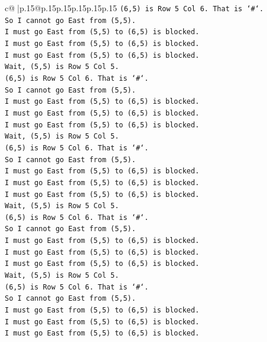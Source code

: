 \documentclass{article}
\begin{document}
{\begin{supertabular}{c@{$\;$}|p{.15\linewidth}@{}p{.15\linewidth}p{.15\linewidth}p{.15\linewidth}p{.15\linewidth}p{.15\linewidth}}
{{{\texttt{(6,5) is Row 5 Col 6. That is `\#`.} \\
\texttt{So I cannot go East from (5,5).} \\
\texttt{I must go East from (5,5) to (6,5) is blocked.} \\
\texttt{I must go East from (5,5) to (6,5) is blocked.} \\
\texttt{I must go East from (5,5) to (6,5) is blocked.} \\
\texttt{Wait, (5,5) is Row 5 Col 5.} \\
\texttt{(6,5) is Row 5 Col 6. That is `\#`.} \\
\texttt{So I cannot go East from (5,5).} \\
\texttt{I must go East from (5,5) to (6,5) is blocked.} \\
\texttt{I must go East from (5,5) to (6,5) is blocked.} \\
\texttt{I must go East from (5,5) to (6,5) is blocked.} \\
\texttt{Wait, (5,5) is Row 5 Col 5.} \\
\texttt{(6,5) is Row 5 Col 6. That is `\#`.} \\
\texttt{So I cannot go East from (5,5).} \\
\texttt{I must go East from (5,5) to (6,5) is blocked.} \\
\texttt{I must go East from (5,5) to (6,5) is blocked.} \\
\texttt{I must go East from (5,5) to (6,5) is blocked.} \\
\texttt{Wait, (5,5) is Row 5 Col 5.} \\
\texttt{(6,5) is Row 5 Col 6. That is `\#`.} \\
\texttt{So I cannot go East from (5,5).} \\
\texttt{I must go East from (5,5) to (6,5) is blocked.} \\
\texttt{I must go East from (5,5) to (6,5) is blocked.} \\
\texttt{I must go East from (5,5) to (6,5) is blocked.} \\
\texttt{Wait, (5,5) is Row 5 Col 5.} \\
\texttt{(6,5) is Row 5 Col 6. That is `\#`.} \\
\texttt{So I cannot go East from (5,5).} \\
\texttt{I must go East from (5,5) to (6,5) is blocked.} \\
\texttt{I must go East from (5,5) to (6,5) is blocked.} \\
\texttt{I must go East from (5,5) to (6,5) is blocked.} \\
}}}
\end{supertabular}}
\end{document}
